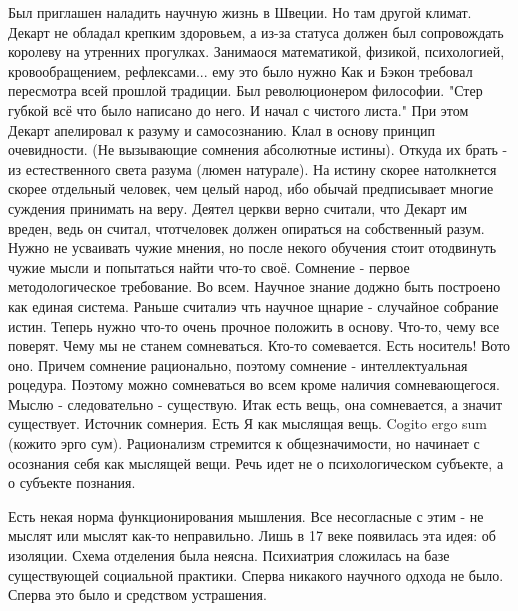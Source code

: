 Был приглашен наладить научную жизнь в Швеции. Но там другой климат. Декарт не обладал крепким здоровьем, а из-за статуса должен был сопровождать королеву на утренних прогулках. Занимаося математикой, физикой, психологией, кровообращением, рефлексами... ему это было нужно
Как и Бэкон требовал пересмотра всей прошлой традиции. Был революционером философии. "Стер губкой всё что было написано до него. И начал с чистого листа." При этом Декарт апелировал к разуму и самосознанию. Клал в основу принцип очевидности. (Не вызывающие сомнения абсолютные истины). Откуда их брать - из естественного света разума (люмен натурале). На истину скорее натолкнется скорее отдельный человек, чем целый народ, ибо обычай предписывает многие суждения принимать на веру. Деятел церкви верно считали, что Декарт им вреден, ведь он считал, чтотчеловек должен опираться на собственный разум. Нужно не усваивать чужие мнения, но после некого обучения стоит отодвинуть чужие мысли и попытаться найти что-то своё.
Сомнение - первое методологическое требование. Во всем.
Научное знание доджно быть построено как единая система. Раньше считалиэ чть научное щнарие - случайное собрание истин. Теперь нужно что-то очень прочное положить в основу. Что-то, чему все поверят.
Чему мы не станем сомневаться. Кто-то сомевается. Есть носитель! Вото оно. Причем сомнение рационально, поэтому сомнение - интеллектуальная роцедура. Поэтому можно сомневаться во всем кроме наличия сомневающегося. Мыслю - следовательно - существую. Итак есть вещь, она сомневается, а значит существует. Источник сомнерия. Есть Я как мыслящая вещь. Cogito ergo sum (кожито эрго сум). Рационализм стремится к общезначимости, но начинает с осознания себя как мыслящей вещи. Речь идет не о психологическом субъекте, а о субъекте познания.

Есть некая норма функционирования мышления. Все несогласные с этим - не мыслят или мыслят как-то неправильно. Лишь в 17 веке появилась эта идея: об изоляции. Схема отделения была неясна. Психиатрия сложилась на базе существующей социальной практики. Сперва никакого научного одхода не было. Сперва это было и средством устрашения.




